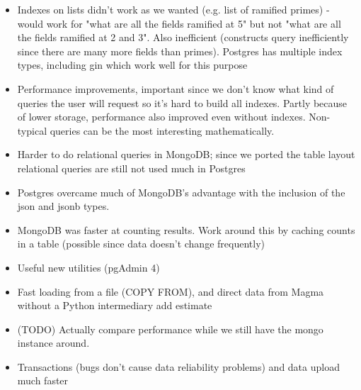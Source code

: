 \documentclass{article}
\begin{document}
\begin{itemize}
\item Indexes on lists didn't work as we wanted (e.g. list of ramified primes) - would work for "what are all the fields ramified at 5" but not "what are all the fields ramified at 2 and 3".  Also inefficient (constructs query inefficiently since there are many more fields than primes).  Postgres has multiple index types, including gin which work well for this purpose
\item Performance improvements, important since we don't know what kind of queries the user will request so it's hard to build all indexes.  Partly because of lower storage, performance also improved even without indexes.  Non-typical queries can be the most interesting mathematically.
\item Harder to do relational queries in MongoDB; since we ported the table layout relational queries are still not used much in Postgres
\item Postgres overcame much of MongoDB's advantage with the inclusion of the json and jsonb types.
\item MongoDB was faster at counting results.  Work around this by caching counts in a table (possible since data doesn't change frequently)
\item Useful new utilities (pgAdmin 4)
\item Fast loading from a file (COPY FROM), and direct data from Magma without a Python intermediary
  add estimate
\item (TODO) Actually compare performance while we still have the mongo instance around.
\item Transactions (bugs don't cause data reliability problems) and data upload much faster
\end{itemize}
\end{document}
